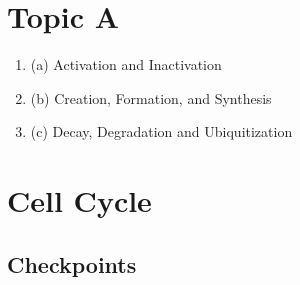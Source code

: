 
\section{Topic A}

\begin{enumerate}
\item (a) Activation and Inactivation
\item (b) Creation, Formation, and Synthesis
\item (c) Decay, Degradation and Ubiquitization
\end{enumerate}

\section{Cell Cycle}

\subsection{Checkpoints}

